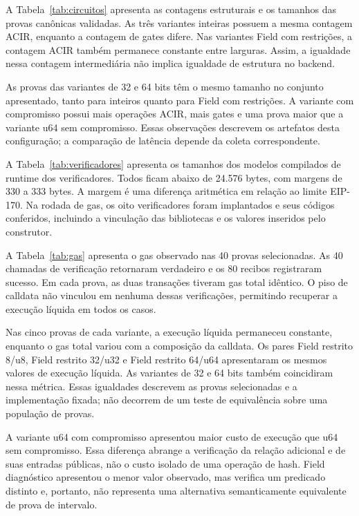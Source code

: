 A Tabela~\ref{tab:circuitos} apresenta as contagens estruturais e os tamanhos das provas canônicas validadas. As três variantes inteiras possuem a mesma contagem ACIR, enquanto a contagem de gates difere. Nas variantes Field com restrições, a contagem ACIR também permanece constante entre larguras. Assim, a igualdade nessa contagem intermediária não implica igualdade de estrutura no backend.



As provas das variantes de 32 e 64 bits têm o mesmo tamanho no conjunto apresentado, tanto para inteiros quanto para Field com restrições. A variante com compromisso possui mais operações ACIR, mais gates e uma prova maior que a variante u64 sem compromisso. Essas observações descrevem os artefatos desta configuração; a comparação de latência depende da coleta correspondente.

A Tabela~\ref{tab:verificadores} apresenta os tamanhos dos modelos compilados de runtime dos verificadores. Todos ficam abaixo de 24.576 bytes, com margens de 330 a 333 bytes. A margem é uma diferença aritmética em relação ao limite EIP-170. Na rodada de gas, os oito verificadores foram implantados e seus códigos conferidos, incluindo a vinculação das bibliotecas e os valores inseridos pelo construtor.



A Tabela~\ref{tab:gas} apresenta o gas observado nas 40 provas selecionadas. As 40 chamadas de verificação retornaram verdadeiro e os 80 recibos registraram sucesso. Em cada prova, as duas transações tiveram gas total idêntico. O piso de calldata não vinculou em nenhuma dessas verificações, permitindo recuperar a execução líquida em todos os casos.





Nas cinco provas de cada variante, a execução líquida permaneceu constante, enquanto o gas total variou com a composição da calldata. Os pares Field restrito 8/u8, Field restrito 32/u32 e Field restrito 64/u64 apresentaram os mesmos valores de execução líquida. As variantes de 32 e 64 bits também coincidiram nessa métrica. Essas igualdades descrevem as provas selecionadas e a implementação fixada; não decorrem de um teste de equivalência sobre uma população de provas.

A variante u64 com compromisso apresentou maior custo de execução que u64 sem compromisso. Essa diferença abrange a verificação da relação adicional e de suas entradas públicas, não o custo isolado de uma operação de hash. Field diagnóstico apresentou o menor valor observado, mas verifica um predicado distinto e, portanto, não representa uma alternativa semanticamente equivalente de prova de intervalo.


